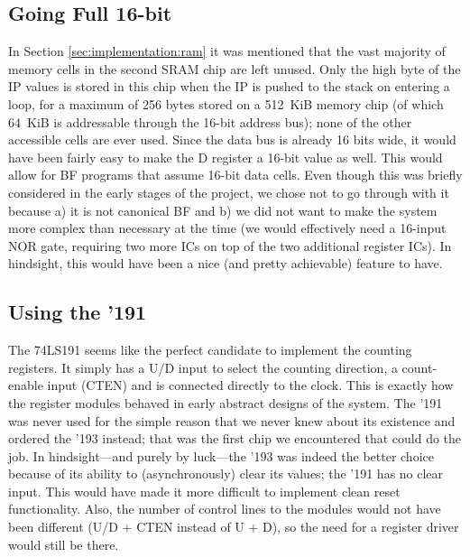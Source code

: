 \subsection{Going Full 16-bit} In Section \ref{sec:implementation:ram} it was mentioned that the vast majority of memory cells in the second SRAM chip are left unused. Only the high byte of the IP values is stored in this chip when the IP is pushed to the stack on entering a loop, for a maximum of 256 bytes stored on a 512~KiB memory chip (of which 64~KiB is addressable through the 16-bit address bus); none of the other accessible cells are ever used. Since the data bus is already 16 bits wide, it would have been fairly easy to make the D register a 16-bit value as well. This would allow for BF programs that assume 16-bit data cells. Even though this was briefly considered in the early stages of the project, we chose not to go through with it because a) it is not canonical BF and b) we did not want to make the system more complex than necessary at the time (we would effectively need a 16-input NOR gate, requiring two more ICs on top of the two additional register ICs). In hindsight, this would have been a nice (and pretty achievable) feature to have.

\subsection{Using the '191} The 74LS191 seems like the perfect candidate to implement the counting registers. It simply has a U/D input to select the counting direction, a count-enable input (CTEN) and is connected directly to the clock. This is exactly how the register modules behaved in early abstract designs of the system. The '191 was never used for the simple reason that we never knew about its existence and ordered the '193 instead; that was the first chip we encountered that could do the job. In hindsight---and purely by luck---the '193 was indeed the better choice because of its ability to (asynchronously) clear its values; the '191 has no clear input. This would have made it more difficult to implement clean reset functionality. Also, the number of control lines to the modules would not have been different (U/D + CTEN instead of U + D), so the need for a register driver would still be there.

